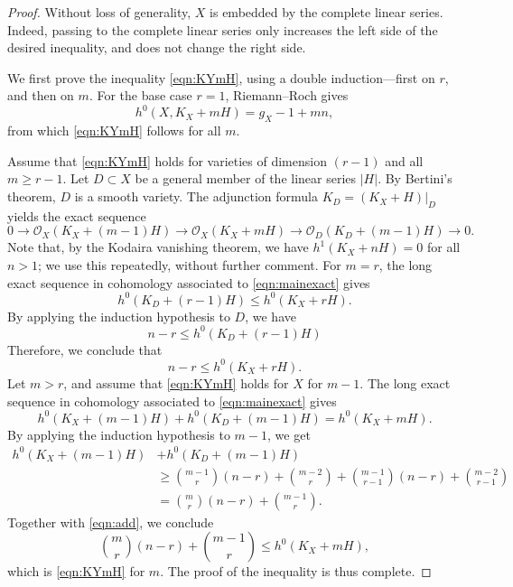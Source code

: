 \documentclass[11pt,reqno]{amsart}
\theoremstyle{plain}
\theoremstyle{definition}
\theoremstyle{remark}
\numberwithin{equation}{section}
\renewcommand{\to}{{\longrightarrow}}
\numberwithin{equation}{section}
\renewcommand{\O}{\mathcal O}
\begin{document}
\begin{proof}
  Without loss of generality, $X$ is embedded by the complete linear series.
  Indeed, passing to the complete linear series only increases the left side of the desired inequality, and does not change the right side.
  
  We first prove the inequality \eqref{eqn:KYmH}, using a double induction---first on $r$, and then on $m$.
  For the base case $r = 1$, Riemann--Roch gives
  \begin{equation}\label{eqn:r1}
    h^0(X, K_X + mH) = g_X - 1 + mn,
  \end{equation}
  from which \eqref{eqn:KYmH} follows for all $m$.

  Assume that \eqref{eqn:KYmH} holds for varieties of dimension $(r-1)$ and all $m \geq r-1$.
  Let $D \subset X$ be a general member of the linear series $|H|$.
  By Bertini's theorem, $D$ is a smooth variety.
  The adjunction formula $K_D = (K_X + H)|_D$ yields the exact sequence
  \begin{equation}\label{eqn:mainexact}
    0 \to \O_X(K_X + (m-1)H) \to \O_X(K_X + mH) \to \O_D(K_D + (m-1)H) \to 0.
  \end{equation}
  Note that, by the Kodaira vanishing theorem, we have $h^1(K_X + nH) = 0$ for all $n > 1$; we use this repeatedly, without further comment.
  For $m = r$, the long exact sequence in cohomology associated to \eqref{eqn:mainexact} gives
  \[ h^0(K_D + (r-1)H) \leq h^0(K_X + rH).\]
  By applying the induction hypothesis to $D$, we have
  \begin{equation}
    n-r \leq h^0(K_D + (r-1)H)
  \end{equation}
  Therefore, we conclude that
  \begin{equation}
    n-r \leq h^0(K_X + rH).
  \end{equation}
  Let $m > r$, and assume that \eqref{eqn:KYmH} holds for $X$ for $m-1$.
  The long exact sequence in cohomology associated to \eqref{eqn:mainexact} gives
  \begin{equation}\label{eqn:add}
    h^0(K_X + (m-1)H) + h^0(K_D + (m-1)H) = h^0(K_X + mH).
  \end{equation}
  By applying the induction hypothesis to $m-1$, we get
  \begin{align*}
    h^0(K_X + (m-1)H) &+ h^0(K_D + (m-1)H)\\
                      &\geq{{m-1} \choose r}(n-r) + {{m-2} \choose {r}} + {{m-1} \choose {r-1}}(n-r) + {{m-2} \choose r-1} \\
                      &={m \choose r} (n-r) + {{m-1} \choose r}.
  \end{align*}
  Together with \eqref{eqn:add}, we conclude 
  \begin{equation}
    {m \choose r} (n-r) + {{m-1} \choose r} \leq h^0(K_X + mH), 
  \end{equation}
  which is \eqref{eqn:KYmH} for $m$.
  The proof of the inequality is thus complete.


\end{proof}
\end{document}

